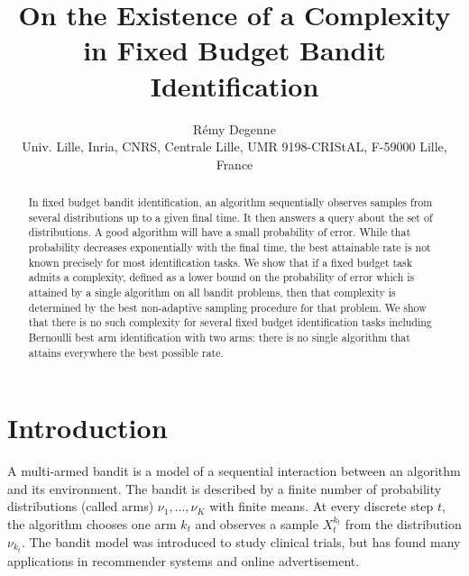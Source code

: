 \documentclass{article}
\title{On the Existence of a Complexity in Fixed Budget Bandit Identification}
\author{Rémy Degenne \\ Univ. Lille, Inria, CNRS, Centrale Lille, UMR 9198-CRIStAL, F-59000 Lille, France}
\begin{document}
\maketitle

\begin{abstract}%
In fixed budget bandit identification, an algorithm sequentially observes samples from several distributions up to a given final time.
It then answers a query about the set of distributions. A good algorithm will have a small probability of error.
While that probability decreases exponentially with the final time, the best attainable rate is not known precisely for most identification tasks.
We show that if a fixed budget task admits a complexity, defined as a lower bound on the probability of error which is attained by a single algorithm on all bandit problems, then that complexity is determined by the best non-adaptive sampling procedure for that problem.
We show that there is no such complexity for several fixed budget identification tasks including Bernoulli best arm identification with two arms: there is no single algorithm that attains everywhere the best possible rate.
\end{abstract}

\section{Introduction}

A multi-armed bandit is a model of a sequential interaction between an algorithm and its environment. The bandit is described by a finite number of probability distributions (called arms) $\nu_1, \ldots, \nu_K$ with finite means. At every discrete step $t$, the algorithm chooses one arm $k_t$ and observes a sample $X_t^{k_t}$ from the distribution $\nu_{k_t}$.
The bandit model was introduced to study clinical trials, but has found many applications in recommender systems and online advertisement.
\end{document}
